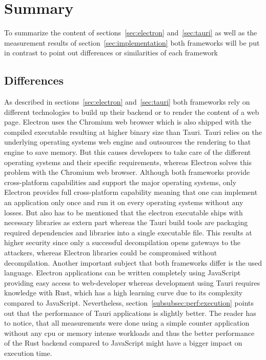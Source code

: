 \section{Summary}
\label{sec:summary}
To summarize the content of sections~\ref{sec:electron} and~\ref{sec:tauri} as well as the measurement results of section~\ref{sec:implementation}
both frameworks will be put in contrast to point out differences or similarities of each framework
\subsection{Differences}\label{subsec:differences}
As described in sections~\ref{sec:electron} and~\ref{sec:tauri} both frameworks rely on different technologies to build up their backend or to render the content of a web page.
Electron uses the Chromium web browser which is also shipped with the compiled executable resulting at higher binary size than Tauri.
Tauri relies on the underlying operating systems web engine and outsources the rendering to that engine to save memory.
But this causes developers to take care of the different operating systems and their specific requirements, whereas Electron solves this problem with the Chromium web browser.
Although both frameworks provide cross-platform capabilities and support the major operating systems, only Electron provides full cross-platform capability meaning that one can implement an application only once
and run it on every operating systems without any losses.
But also has to be mentioned that the electron executable ships with necessary libraries as extern part whereas the Tauri build tools are packaging required dependencies and libraries into a single executable file.
This results at higher security since only a successful decompilation opens gateways to the attackers, whereas Electron libraries could be compromised without decompilation.
Another important subject that both frameworks differ is the used language.
Electron applications can be written completely using JavaScript providing easy access to web-developer whereas development using Tauri requires knowledge with Rust, which has a high learning curve due to its complexity compared to JavaScript.
Nevertheless, section~\ref{subsubsec:perf:execution} points out that the performance of Tauri applications is slightly better.
The reader has to notice, that all measurements were done using a simple counter application without any cpu or memory intense workloads and thus the better performance of the Rust backend compared to JavaScript might have a bigger impact on execution time.
